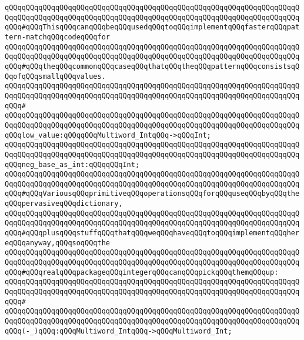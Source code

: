 \verb|qQQqqQQqqQQqqQQqqQQqqQQqqQQqqQQqqQQqqQQqqQQqqQQqqQQqqQQqqQQqqQQqqQQqqQQqqQQqqQQqqQQqqQQqqQQqqQQqqQQqqQQqqQQqqQQqqQQqqQQqqQQqqQQqqQQqqQQqqQQqqQQq#qQQqThisqQQqcanqQQqbeqQQqusedqQQqtoqQQqimplementqQQqfasterqQQqpattern-matchqQQqcodeqQQqfor|\newline
\verb|qQQqqQQqqQQqqQQqqQQqqQQqqQQqqQQqqQQqqQQqqQQqqQQqqQQqqQQqqQQqqQQqqQQqqQQqqQQqqQQqqQQqqQQqqQQqqQQqqQQqqQQqqQQqqQQqqQQqqQQqqQQqqQQqqQQqqQQqqQQqqQQq#qQQqtheqQQqcommonqQQqcaseqQQqthatqQQqtheqQQqpatternqQQqconsistsqQQqofqQQqsmallqQQqvalues.|\newline
\verb|qQQqqQQqqQQqqQQqqQQqqQQqqQQqqQQqqQQqqQQqqQQqqQQqqQQqqQQqqQQqqQQqqQQqqQQqqQQqqQQqqQQqqQQqqQQqqQQqqQQqqQQqqQQqqQQqqQQqqQQqqQQqqQQqqQQqqQQqqQQqqQQq#|\newline
\verb|qQQqqQQqqQQqqQQqqQQqqQQqqQQqqQQqqQQqqQQqqQQqqQQqqQQqqQQqqQQqqQQqqQQqqQQqqQQqqQQqqQQqqQQqqQQqqQQqqQQqqQQqqQQqqQQqqQQqqQQqqQQqqQQqqQQqqQQqqQQqqQQqlow_value:qQQqqQQqMultiword_IntqQQq->qQQqInt;|\newline
\verb|qQQqqQQqqQQqqQQqqQQqqQQqqQQqqQQqqQQqqQQqqQQqqQQqqQQqqQQqqQQqqQQqqQQqqQQqqQQqqQQqqQQqqQQqqQQqqQQqqQQqqQQqqQQqqQQqqQQqqQQqqQQqqQQqqQQqqQQqqQQqqQQqneg_base_as_int:qQQqqQQqInt;|\newline
\newline
\verb|qQQqqQQqqQQqqQQqqQQqqQQqqQQqqQQqqQQqqQQqqQQqqQQqqQQqqQQqqQQqqQQqqQQqqQQqqQQqqQQqqQQqqQQqqQQqqQQqqQQqqQQqqQQqqQQqqQQqqQQqqQQqqQQqqQQqqQQqqQQqqQQq#qQQqVariousqQQqprimitiveqQQqoperationsqQQqforqQQquseqQQqbyqQQqtheqQQqpervasiveqQQqdictionary,|\newline
\verb|qQQqqQQqqQQqqQQqqQQqqQQqqQQqqQQqqQQqqQQqqQQqqQQqqQQqqQQqqQQqqQQqqQQqqQQqqQQqqQQqqQQqqQQqqQQqqQQqqQQqqQQqqQQqqQQqqQQqqQQqqQQqqQQqqQQqqQQqqQQqqQQq#qQQqplusqQQqstuffqQQqthatqQQqweqQQqhaveqQQqtoqQQqimplementqQQqhereqQQqanyway,qQQqsoqQQqthe|\newline
\verb|qQQqqQQqqQQqqQQqqQQqqQQqqQQqqQQqqQQqqQQqqQQqqQQqqQQqqQQqqQQqqQQqqQQqqQQqqQQqqQQqqQQqqQQqqQQqqQQqqQQqqQQqqQQqqQQqqQQqqQQqqQQqqQQqqQQqqQQqqQQqqQQq#qQQqrealqQQqpackageqQQqintegerqQQqcanqQQqpickqQQqthemqQQqup:|\newline
\verb|qQQqqQQqqQQqqQQqqQQqqQQqqQQqqQQqqQQqqQQqqQQqqQQqqQQqqQQqqQQqqQQqqQQqqQQqqQQqqQQqqQQqqQQqqQQqqQQqqQQqqQQqqQQqqQQqqQQqqQQqqQQqqQQqqQQqqQQqqQQqqQQq#|\newline
\verb|qQQqqQQqqQQqqQQqqQQqqQQqqQQqqQQqqQQqqQQqqQQqqQQqqQQqqQQqqQQqqQQqqQQqqQQqqQQqqQQqqQQqqQQqqQQqqQQqqQQqqQQqqQQqqQQqqQQqqQQqqQQqqQQqqQQqqQQqqQQqqQQq(-_)qQQq:qQQqMultiword_IntqQQq->qQQqMultiword_Int;|\newline
